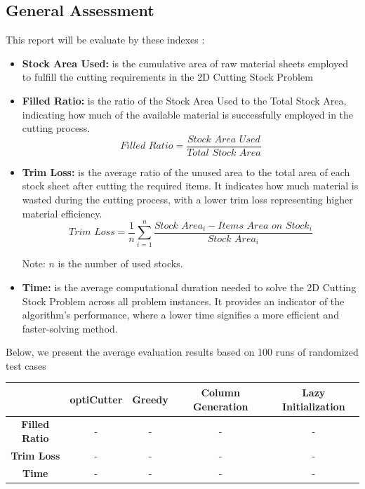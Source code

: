 \documentclass[a4paper]{article}
\begin{document}
\subsection{General Assessment}
This report will be evaluate by these indexes : 
\begin{itemize}
    \item \textbf{Stock Area Used: } is the cumulative area of raw material sheets employed to fulfill the cutting requirements in the 2D Cutting Stock Problem
    \item \textbf{Filled Ratio:}  is the ratio of the Stock Area Used to the Total Stock Area, indicating how much of the available material is successfully employed in the cutting process.
     \[
    \textit{Filled Ratio} = \frac{\textit{Stock Area Used}}{\textit{Total Stock Area}}
    \]
    \item \textbf{Trim Loss:} is the average ratio of the unused area to the total area of each stock sheet after cutting the required items. It indicates how much material is wasted during the cutting process, with a lower trim loss representing higher material efficiency.
    \[
    \textit{Trim Loss} = \frac{1}{n} \sum_{i=1}^{n} \frac{\textit{Stock Area}_i - \textit{Items Area on Stock}_i}{\textit{Stock Area}_i}
    \]
    \begin{flushright}
        \centering
        \footnotesize{Note: \( n \) is the number of used stocks.}
    \end{flushright}
\item \textbf{Time:} is the average computational duration needed to solve the 2D Cutting Stock Problem across all problem instances. It provides an indicator of the algorithm’s performance, where a lower time signifies a more efficient and faster-solving method.
\end{itemize}
Below, we present the average evaluation results based on 100 runs of randomized test cases

 \begin{table}[h!]
        \centering
        \begin{tabular}{|c|c|c|c|c|}
            \hline
            \textbf{} & \textbf{optiCutter} & \textbf{Greedy} & \textbf{Column Generation} & \textbf{Lazy Initialization} \\ \hline
            \textbf{Filled Ratio} & - & - & - & - \\ \hline
            \textbf{Trim Loss} & - & - & - & - \\ \hline
            \textbf{Time} & - & - & - & - \\ \hline
        \end{tabular}
\end{table}
\end{document}

